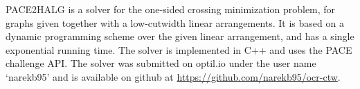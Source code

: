 \documentclass[a4paper,UKenglish,cleveref, autoref, thm-restate]{lipics-v2021}
\begin{document}
PACE2HALG is a solver for the one-sided crossing minimization problem, for graphs given together with a low-cutwidth linear arrangements. It is based on a dynamic programming scheme over the given linear arrangement, and has a single exponential running time. The solver is implemented in C++ and uses the PACE challenge API. The solver was submitted on optil.io under the user name `narekb95' and is available on github at \url{https://github.com/narekb95/ocr-ctw}.
\end{document}
